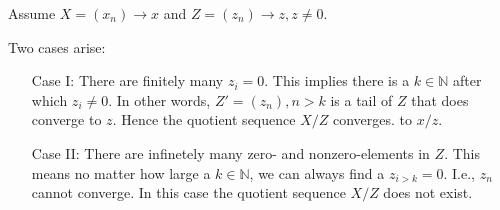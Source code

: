 \documentclass[boxes, qed]{homework}
\begin{document}
\newenvironment{amatrix}[1]{%
  \left[\begin{array}{@{}*{#1}{c}|c@{}}
}{%
  \end{array}\right]
}

\newenvironment{augmatrix}[1]{%
  \left[\begin{array}{#1}
}{%
  \end{array}\right]
}

\begin{problem}Assume $X=(x_n)\rightarrow{x}$ and
  $Z=(z_n)\rightarrow{z}, z\ne{0}$.
\end{problem}
\begin{solution}Two cases arise:
  \begin{enumerate}
    \item[Case I:] There are finitely many $z_i=0$. This implies 
      there is a $k\in{\mathbb{N}}$ after which $z_i\ne{0}$.
      In other words, $Z'=(z_n), n>k$ is a tail of $Z$ that does 
      converge to $z$. Hence the quotient sequence $X/Z$ converges.
      to $x/z$.
    \item[Case II:] There are infinetely many zero- and nonzero-elements
      in $Z$. This means no matter how large a $k\in{\mathbb{N}}$,
      we can always find a $z_{i>k}=0$. I.e., $z_n$ cannot converge.
      In this case the quotient sequence $X/Z$ does not exist.
  \end{enumerate}
\end{solution}
\end{document}
